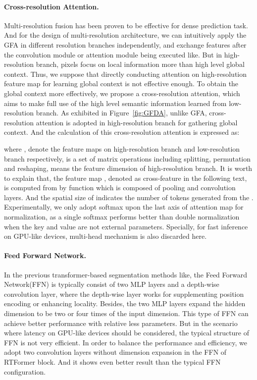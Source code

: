 \documentclass{article}
\begin{document}
\vspace{-2mm}
\paragraph{Cross-resolution Attention.}

Multi-resolution fusion has been proven to be effective for dense prediction task. And for the design of multi-resolution architecture, we can intuitively apply the GFA in different resolution branches independently, and exchange features after the convolution module or attention module being executed like\cite{wang2020deep, yuan2021hrformer}. But in high-resolution branch, pixels focus on local information more than high level global context. Thus, we suppose that directly conducting attention on high-resolution feature map for learning global context is not effective enough. To obtain the global context more effectively, we propose a cross-resolution attention, which aims to make full use of the high level semantic information learned from low-resolution branch. As exhibited in Figure~\ref{fig:GFDA}, unlike GFA, cross-resolution attention is adopted in high-resolution branch for gathering global context. And the calculation of this cross-resolution attention is expressed as:



where ,  denote the feature maps on high-resolution branch and low-resolution branch respectively,  is a set of matrix operations including splitting, permutation and reshaping,  means the feature dimension of high-resolution branch. It is worth to explain that, the feature map , denoted as cross-feature in the following text, is computed from  by function  which is composed of pooling and convolution layers. And the spatial size of  indicates the number of tokens generated from the . Experimentally, we only adopt softmax upon the last axis of attention map for normalization, as a single softmax performs better than double normalization when the key and value are not external parameters. Specially, for fast inference on GPU-like devices, multi-head mechanism is also discarded here.

\vspace{-2mm}
\paragraph{Feed Forward Network.}

In the previous transformer-based segmentation methods like\cite{xie2021segformer, yuan2021hrformer}, the Feed Forward Network(FFN) is typically consist of two MLP layers and a depth-wise  convolution layer, where the depth-wise  layer works for supplementing position encoding or enhancing locality. Besides, the two MLP layers expand the hidden dimension to be two or four times of the input dimension. This type of FFN can achieve better performance with relative less parameters. But in the scenario where latency on GPU-like devices should be considered, the typical structure of FFN is not very efficient. In order to balance the performance and efficiency, we adopt two  convolution layers without dimension expansion in the FFN of RTFormer block. And it shows even better result than the typical FFN configuration.
\end{document}
